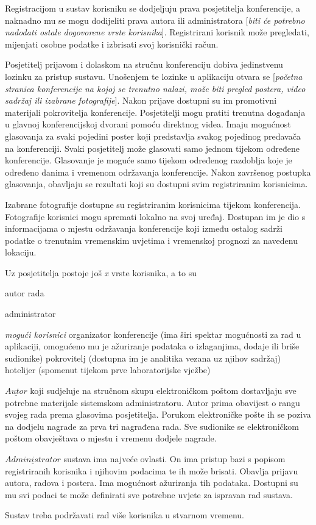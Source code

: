 		Registracijom u sustav korisniku se dodjeljuju prava posjetitelja konferencije, a naknadno mu se mogu dodijeliti prava autora ili administratora [\textit{biti će potrebno nadodati ostale dogovorene vrste korisnika}]. Registrirani korisnik može pregledati, mijenjati osobne podatke i izbrisati svoj korisnički račun.
		
		Posjetitelj prijavom i dolaskom na stručnu konferenciju dobiva jedinstvenu lozinku za pristup sustavu. Unošenjem te lozinke u aplikaciju otvara se [\textit{početna stranica konferencije na kojoj se trenutno nalazi, može biti pregled postera, video sadržaj ili izabrane fotografije}]. Nakon prijave dostupni su im promotivni materijali pokrovitelja konferencije. Posjetitelji mogu pratiti trenutna događanja u glavnoj konferencijskoj dvorani pomoću direktnog videa. Imaju mogućnost glasovanja za svaki pojedini poster koji predstavlja svakog pojedinog predavača na konferenciji. Svaki posjetitelj može glasovati samo jednom tijekom određene konferencije. Glasovanje je moguće samo tijekom određenog razdoblja koje je određeno danima i vremenom održavanja konferencije. Nakon završenog postupka glasovanja, obavljaju se rezultati koji su dostupni svim registriranim korisnicima. 
		
		Izabrane fotografije dostupne su registriranim korisnicima tijekom konferencija. Fotografije korisnici mogu spremati lokalno na svoj uređaj. Dostupan im je dio s informacijama o mjestu održavanja konferencije koji između ostalog sadrži podatke o trenutnim vremenskim uvjetima i vremenskoj prognozi za navedenu lokaciju.
		
		Uz posjetitelja postoje još \textit{x} vrste korisnika, a to su
		\begin{packed_item}
			\item autor rada
			\item administrator
			\item \textit{mogući korisnici}
			\subitem organizator konferencije (ima širi spektar mogućnosti za rad u aplikaciji, omogućeno mu je ažuriranje podataka o izlaganjima, dodaje ili briše sudionike)
			\subitem pokrovitelj (dostupna im je analitika vezana uz njihov sadržaj)
			\subitem hotelijer (spomenut tijekom prve laboratorijske vježbe)
		\end{packed_item}
		
		$\underline{Autor}$ koji sudjeluje na stručnom skupu elektroničkom poštom dostavljaju sve potrebne materijale sistemskom administratoru. Autor prima obavijest o rangu svojeg rada prema glasovima posjetitelja. Porukom elektroničke pošte ih se poziva na dodjelu nagrade za prva tri nagrađena rada. Sve sudionike se elektroničkom poštom obavještava o mjestu i vremenu dodjele nagrade.
		
		$\underline{Administrator}$ sustava ima najveće ovlasti. On ima pristup bazi s popisom registriranih korisnika i njihovim podacima te ih može brisati. Obavlja prijavu autora, radova i postera. Ima mogućnost ažuriranja tih podataka. Dostupni su mu svi podaci te može definirati sve potrebne uvjete za ispravan rad sustava.
		
		Sustav treba podržavati rad više korisnika u stvarnom vremenu. 

		
		\eject
		
